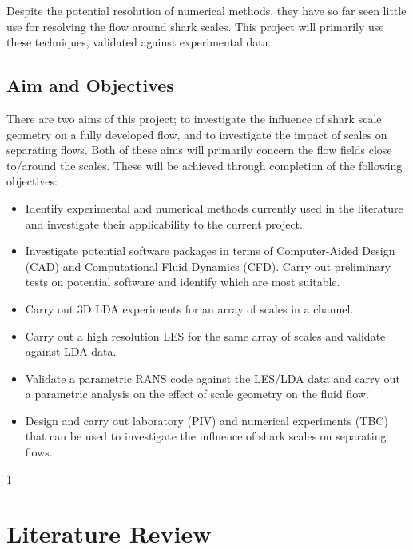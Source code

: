 \documentclass[12pt,oneside,a4paper]{article}
\begin{document}
Despite the potential resolution of numerical methods, they have so far seen little use for resolving the flow around shark scales. This project will primarily use these techniques, validated against experimental data.

\subsection{Aim and Objectives}
\label{section:AandO}

There are two aims of this project; to investigate the influence of shark scale geometry on a fully developed flow, and to investigate the impact of scales on separating flows. Both of these aims will primarily concern the flow fields close to/around the scales. These will be achieved through completion of the following objectives:
\begin{itemize}
\itemsep0em

\item Identify experimental and numerical methods currently used in the literature and investigate their applicability to the current project.

\item Investigate potential software packages in terms of Computer-Aided Design (CAD) and Computational Fluid Dynamics (CFD). Carry out preliminary tests on potential software and identify which are most suitable. 

\item Carry out 3D LDA experiments for an array of scales in a channel.

\item Carry out a high resolution LES for the same array of scales and validate against LDA data. 

\item Validate a parametric RANS code against the LES/LDA data and carry out a parametric analysis on the effect of scale geometry on the fluid flow. 

\item Design and carry out laboratory (PIV) and numerical experiments (TBC) that can be used to investigate the influence of shark scales on separating flows.  

\end{itemize}

1\section{Literature Review}
\label{section:literatureReview}
\end{document}
